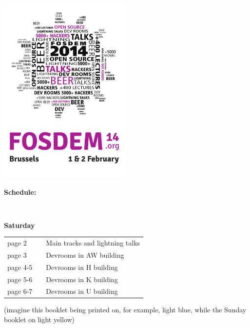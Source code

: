 \documentclass[a4paper,10pt]{article}
\begin{document}
\pagestyle{empty}
\label{cover}
\begin{center}
\includegraphics[width=0.5\textwidth]{artwork/cover}

\vfill
{\Huge \bf Schedule: }

$ $

{\Huge \bf Saturday }


\vspace{3em}
{\Large
\begin{tabular}{lll}
page 2   & &  Main tracks and lightning talks \\
page 3   & &  Devrooms in AW building \\
page 4-5 & &  Devrooms in H building \\
page 5-6 & &  Devrooms in K building \\
page 6-7 & &  Devrooms in U building \\
\end{tabular}
}

\vfill
(imagine this booklet being printed on, for example, light blue, while the Sunday booklet on light yellow)

\end{center}



{%
\fontsize{10}{8.2}\selectfont%
\renewcommand{\arraystretch}{0.9}%
%
%
}



\end{document}
